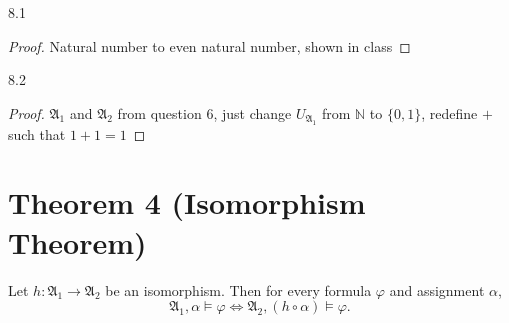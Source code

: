 \documentclass{article}
\begin{document}
8.1 
\begin{proof}
Natural number to even natural number, shown in class
\end{proof}
8.2
\begin{proof}
    $\mathfrak{A}_1$ and  $\mathfrak{A}_2$ from question 6, just change $U_{\mathfrak{A}_1}$ from $\mathbb{N}$ to $\{0,1\}$, redefine $+$ such that $1+1 = 1$
\end{proof}

\section*{Theorem 4 (Isomorphism Theorem)}
Let $h : \mathfrak{A}_1 \to \mathfrak{A}_2$ be an isomorphism. Then for every formula $\varphi$ and assignment $\alpha$,
\[
\mathfrak{A}_1, \alpha \models \varphi \iff \mathfrak{A}_2, (h \circ \alpha) \models \varphi.
\]


  
\end{document}
